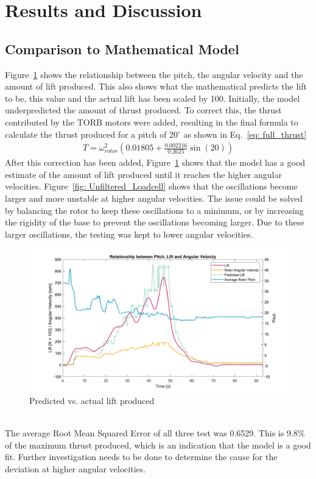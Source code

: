         \section{Results and Discussion}
        \subsection{Comparison to Mathematical Model}
            Figure~\ref{fig: lift_produced} shows the relationship between the pitch, the angular velocity and the amount of lift produced. This also shows what the mathematical predicts the lift to be, this value and the actual lift has been scaled by 100.  Initially, the model underpredicted the amount of thrust produced. To correct this, the thrust contributed by the TORB motors were added, resulting in the final formula to calculate the thrust produced for a pitch of 20\(^\circ\) as shown in Eq.~\ref{eq: full_thrust}
            \begin{align}
                T =\omega_{rotor}^2\left(0.01805+\frac{0.002216}{0.2625}\sin(20)\right) \label{eq: full_thrust}
            \end{align}
            After this correction has been added, Figure~\ref{fig: lift_produced} shows that the model has a good estimate of the amount of lift produced until it reaches the higher angular velocities. Figure~\ref{fig: Unfiltered_Loadcell} shows that the oscillations become larger and more unstable at higher angular velocities. The issue could be solved by balancing the rotor to keep these oscillations to a minimum, or by increasing the rigidity of the base to prevent the oscillations becoming larger. Due to these larger oscillations, the testing was kept to lower angular velocities.
            \begin{figure}[h]
                \centering
                \includegraphics*[width = \textwidth]{figs/Data_Analysis/Lift, Pitch and Speed-Speed Sweep.png}
                \caption{Predicted vs. actual lift produced}
                \label{fig: lift_produced}
            \end{figure}\\
            The average Root Mean Squared Error of all three test was 0.6529. This is 9.8\% of the maximum thrust produced, which is an indication that the model is a good fit. Further investigation needs to be done to determine the cause for the deviation at higher angular velocities.
            \\
